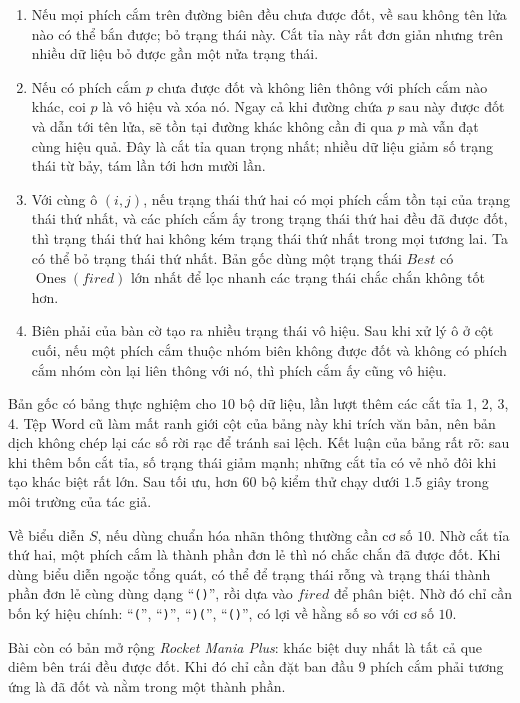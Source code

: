 \documentclass[11pt]{article}
\begin{document}
\begin{enumerate}
  \item Nếu mọi phích cắm trên đường biên đều chưa được đốt, về sau không tên
  lửa nào có thể bắn được; bỏ trạng thái này. Cắt tỉa này rất đơn giản nhưng
  trên nhiều dữ liệu bỏ được gần một nửa trạng thái.
  \item Nếu có phích cắm \(p\) chưa được đốt và không liên thông với phích cắm
  nào khác, coi \(p\) là vô hiệu và xóa nó. Ngay cả khi đường chứa \(p\) sau
  này được đốt và dẫn tới tên lửa, sẽ tồn tại đường khác không cần đi qua \(p\)
  mà vẫn đạt cùng hiệu quả. Đây là cắt tỉa quan trọng nhất; nhiều dữ liệu giảm
  số trạng thái từ bảy, tám lần tới hơn mười lần.
  \item Với cùng ô \((i,j)\), nếu trạng thái thứ hai có mọi phích cắm tồn tại
  của trạng thái thứ nhất, và các phích cắm ấy trong trạng thái thứ hai đều đã
  được đốt, thì trạng thái thứ hai không kém trạng thái thứ nhất trong mọi
  tương lai. Ta có thể bỏ trạng thái thứ nhất. Bản gốc dùng một trạng thái
  \(Best\) có \(\operatorname{Ones}(fired)\) lớn nhất để lọc nhanh các trạng
  thái chắc chắn không tốt hơn.
  \item Biên phải của bàn cờ tạo ra nhiều trạng thái vô hiệu. Sau khi xử lý ô
  ở cột cuối, nếu một phích cắm thuộc nhóm biên không được đốt và không có
  phích cắm nhóm còn lại liên thông với nó, thì phích cắm ấy cũng vô hiệu.
\end{enumerate}

Bản gốc có bảng thực nghiệm cho \(10\) bộ dữ liệu, lần lượt thêm các cắt tỉa
1, 2, 3, 4. Tệp Word cũ làm mất ranh giới cột của bảng này khi trích văn bản,
nên bản dịch không chép lại các số rời rạc để tránh sai lệch. Kết luận của
bảng rất rõ: sau khi thêm bốn cắt tỉa, số trạng thái giảm mạnh; những cắt tỉa
có vẻ nhỏ đôi khi tạo khác biệt rất lớn. Sau tối ưu, hơn \(60\) bộ kiểm thử
chạy dưới \(1.5\) giây trong môi trường của tác giả.

Về biểu diễn \(S\), nếu dùng chuẩn hóa nhãn thông thường cần cơ số \(10\).
Nhờ cắt tỉa thứ hai, một phích cắm là thành phần đơn lẻ thì nó chắc chắn đã
được đốt. Khi dùng biểu diễn ngoặc tổng quát, có thể để trạng thái rỗng và
trạng thái thành phần đơn lẻ cùng dùng dạng ``\texttt{()}'', rồi dựa vào
\(fired\) để phân biệt. Nhờ đó chỉ cần bốn ký hiệu chính: ``\texttt{(}'',
``\texttt{)}'', ``\texttt{)(}'', ``\texttt{()}'', có lợi về hằng số so với cơ
số \(10\).

Bài còn có bản mở rộng \textit{Rocket Mania Plus}: khác biệt duy nhất là tất
cả que diêm bên trái đều được đốt. Khi đó chỉ cần đặt ban đầu \(9\) phích cắm
phải tương ứng là đã đốt và nằm trong một thành phần.
\end{document}
